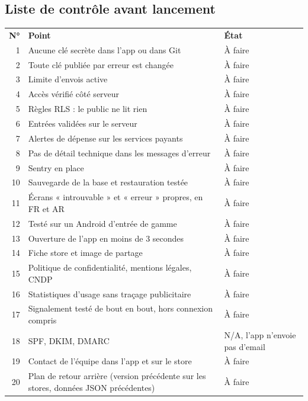 \documentclass[11pt,a4paper]{article}
\newcommand{\hd}[1]{\textbf{\color{white}#1}}
\newcommand{\hdrow}{\rowcolor{brand}}
\begin{document}
\subsection{Liste de contrôle avant lancement}
\begin{xltabular}{\textwidth}{@{}r Y l@{}}
\hdrow \hd{N°} & \hd{Point} & \hd{État} \\
1 & Aucune clé secrète dans l'app ou dans Git & À faire \\
2 & Toute clé publiée par erreur est changée & À faire \\
3 & Limite d'envois active & À faire \\
4 & Accès vérifié côté serveur & À faire \\
5 & Règles RLS : le public ne lit rien & À faire \\
6 & Entrées validées sur le serveur & À faire \\
7 & Alertes de dépense sur les services payants & À faire \\
8 & Pas de détail technique dans les messages d'erreur & À faire \\
9 & Sentry en place & À faire \\
10 & Sauvegarde de la base et restauration testée & À faire \\
11 & Écrans « introuvable » et « erreur » propres, en FR et AR & À faire \\
12 & Testé sur un Android d'entrée de gamme & À faire \\
13 & Ouverture de l'app en moins de 3 secondes & À faire \\
14 & Fiche store et image de partage & À faire \\
15 & Politique de confidentialité, mentions légales, CNDP & À faire \\
16 & Statistiques d'usage sans traçage publicitaire & À faire \\
17 & Signalement testé de bout en bout, hors connexion compris & À faire \\
18 & SPF, DKIM, DMARC & N/A, l'app n'envoie pas d'email \\
19 & Contact de l'équipe dans l'app et sur le store & À faire \\
20 & Plan de retour arrière (version précédente sur les stores, données JSON précédentes) & À faire \\
\end{xltabular}

\Needspace{7cm}
\end{document}
